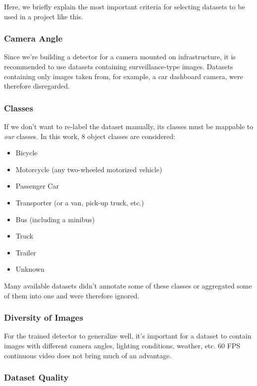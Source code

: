 Here, we briefly explain the most important criteria for selecting datasets to
be used in a project like this.

\subsubsection*{Camera Angle}

Since we're building a detector for a camera mounted on infrastructure, it is
recommended to use datasets containing surveillance-type images. Datasets
containing only images taken from, for example, a car dashboard camera, were
therefore disregarded.

\subsubsection*{Classes}

If we don't want to re-label the dataset manually, its classes must be mappable
to \textit{our} classes. In this work, 8 object classes are considered:
\begin{itemize}
    \item Bicycle
    \item Motorcycle (any two-wheeled motorized vehicle)
    \item Passenger Car
    \item Transporter (or a van, pick-up truck, etc.)
    \item Bus (including a minibus)
    \item Truck
    \item Trailer
    \item Unknown
\end{itemize}

Many available datasets didn't annotate some of these classes or aggregated some of them into one
and were therefore ignored.

\subsubsection*{Diversity of Images}

For the trained detector to generalize well, it's important for a dataset to
contain images with different camera angles, lighting conditions, weather, etc.
60 FPS continuous video does not bring much of an advantage.

\subsubsection*{Dataset Quality}

